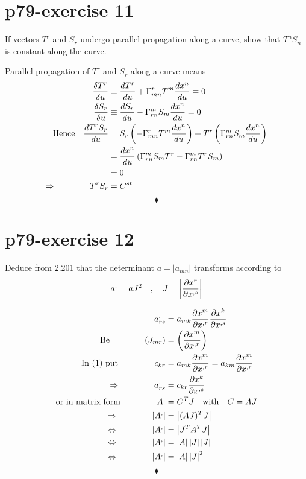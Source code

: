 \section{p79-exercise 11}
\begin{tcolorbox}
If vectors $T^r$ and $S_r$ undergo parallel propagation along a curve, show that $T^nS_n$ is constant along the curve.
\end{tcolorbox}
Parallel propagation of $T^r$ and $S_r$  along a curve means
\begin{align}
\frac{\delta T^r}{\delta u} &\equiv \dv{T^r}{u} + \Gamma^r_{mn}T^m \dv{x^n}{u} = 0\\
\frac{\delta S_r}{\delta u} &\equiv \dv{S_r}{u} - \Gamma^m_{rn}S_m \dv{x^n}{u} = 0\\
\text{Hence}\quad \dv{T^rS_r}{u} &= S_r\left(-\Gamma^r_{mn}T^m\dv{x^n}{u}\right) + T^r\left(\Gamma^m_{rn}S_m \dv{x^n}{u} \right)\\
\ &= \dv{x^n}{u}\left(\Gamma^m_{rn}S_mT^r -  \Gamma^m_{rn}T^rS_m\right)\\
\ &=0\\
\Rightarrow \quad\quad\quad\quad T^rS_r &= C^{st}
\end{align} 
$$\blacklozenge$$
\newpage

\section{p79-exercise 12}
\begin{tcolorbox}
Deduce from 2.201 that the determinant $a= \left | a_{mn} \right |$ transforms according to $$a^, = aJ^2 \quad , \quad J = \left | \pdv{x^r}{x^{,s}}\right|$$
\end{tcolorbox}
\begin{align}
\ a^,_{rs} &= a_{mk} \pdv{x^{m}}{x^{,r}} \pdv{x^{k}}{x^{,s}}\\
\text{Be}\quad\quad\quad\quad \left(J_{mr} \right )&= \left (\pdv{x^{m}}{x^{,r}}\right )\\
\text{In (1) put  }\quad\quad\quad\quad c_{kr} &= a_{mk} \pdv{x^{m}}{x^{,r}}= a_{km} \pdv{x^{m}}{x^{,r}} \\
\Rightarrow\quad\quad\quad\quad a^,_{rs} &= c_{kr} \pdv{x^{k}}{x^{,s}}\\
\text{or in matrix form  } \quad\quad\quad\quad A^, &= C^T J\quad \text{with}\quad C = AJ\\
\Rightarrow\quad\quad\quad\quad \left |A^, \right| &= \left | (AJ)^T J\right |\\
\Leftrightarrow\quad\quad\quad\quad \left |A^, \right| &= \left | J^T A^T J\right |\\
\Leftrightarrow\quad\quad\quad\quad \left |A^, \right| &= \left | A\right | \left |J\right |\left |J\right |\\
\Leftrightarrow\quad\quad\quad\quad \left |A^, \right| &= \left | A\right | \left |J\right | ^2
\end{align}
$$\blacklozenge$$
\newpage

